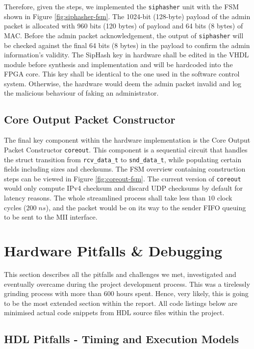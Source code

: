 \documentclass[a4paper]{report}
\newcommand{\proglang}{\textsf}
\newcommand{\code}{\texttt}
\begin{document}
Therefore, given the steps, we implemented the \code{siphasher} unit with the FSM shown in Figure \ref{fig:siphasher-fsm}. The 1024-bit (128-byte) payload of the admin packet is allocated with 960 bits (120 bytes) of payload and 64 bits (8 bytes) of MAC. Before the admin packet acknowledgement, the output of \code{siphasher} will be checked against the final 64 bits (8 bytes) in the payload to confirm the admin information's validity. The SipHash key in hardware shall be edited in the \proglang{VHDL} module before synthesis and implementation and will be hardcoded into the FPGA core. This key shall be identical to the one used in the software control system. Otherwise, the hardware would deem the admin packet invalid and log the malicious behaviour of faking an administrator.

\subsection{Core Output Packet Constructor}

The final key component within the hardware implementation is the Core Output Packet Constructor \code{coreout}. This component is a sequential circuit that handles the struct transition from \code{rcv\_data\_t} to \code{snd\_data\_t}, while populating certain fields including sizes and checksums. The FSM overview containing construction steps can be viewed in Figure \ref{fig:coreout-fsm}. The current version of \code{coreout} would only compute IPv4 checksum and discard UDP checksums by default for latency reasons. The whole streamlined process shall take less than $10$ clock cycles ($200\; ns$), and the packet would be on its way to the sender FIFO queuing to be sent to the MII interface.


\section{Hardware Pitfalls \& Debugging}
\label{section:implementation-hardware-debugging}

This section describes all the pitfalls and challenges we met, investigated and eventually overcame during the project development process. This was a tirelessly grinding process with more than 600 hours spent. Hence, very likely, this is going to be the most extended section within the report. All code listings below are minimised actual code snippets from HDL source files within the project. 

\subsection{HDL Pitfalls - Timing and Execution Models}
\end{document}
